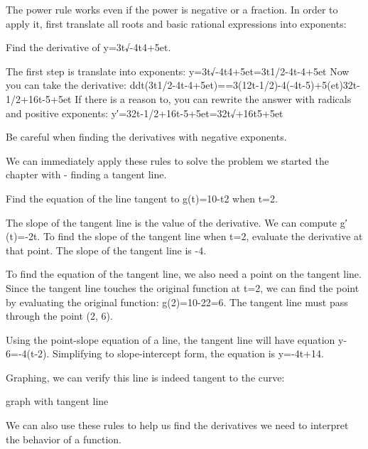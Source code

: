The power rule works even if the power is negative or a fraction. In order to apply it, first translate all roots and basic rational expressions into exponents:

\begin{example}
Find the derivative of y=3t√-4t4+5et.

\begin{solution} The first step is translate into exponents:
y=3t√-4t4+5et=3t1/2-4t-4+5et
Now you can take the derivative:
ddt(3t1/2-4t-4+5et)==3(12t-1/2)-4(-4t-5)+5(et)32t-1/2+16t-5+5et
If there is a reason to, you can rewrite the answer with radicals and positive exponents:
y′=32t-1/2+16t-5+5et=32t√+16t5+5et
\end{solution}\end{example}

Be careful when finding the derivatives with negative exponents.

We can immediately apply these rules to solve the problem we started the chapter with - finding a tangent line.

\begin{example}
Find the equation of the line tangent to g(t)=10-t2 when t=2.

\begin{solution} The slope of the tangent line is the value of the derivative. We can compute g′(t)=-2t. To find the slope of the tangent line when t=2, evaluate the derivative at that point. The slope of the tangent line is -4.

To find the equation of the tangent line, we also need a point on the tangent line. Since the tangent line touches the original function at t=2, we can find the point by evaluating the original function: g(2)=10-22=6. The tangent line must pass through the point (2, 6).

Using the point-slope equation of a line, the tangent line will have equation y-6=-4(t-2). Simplifying to slope-intercept form, the equation is y=-4t+14.

Graphing, we can verify this line is indeed tangent to the curve:

graph with tangent line
\end{solution}\end{example}

We can also use these rules to help us find the derivatives we need to interpret the behavior of a function.

